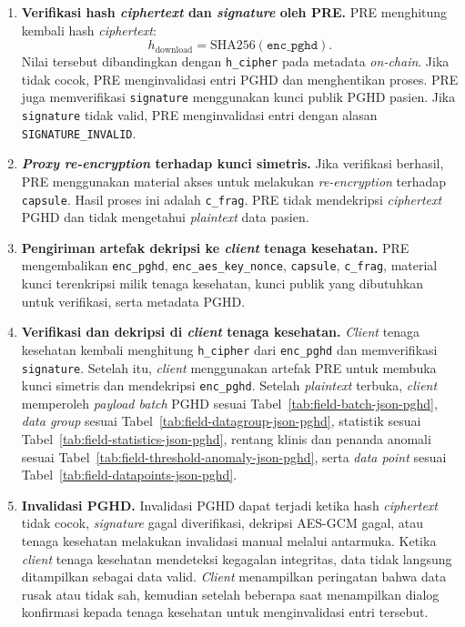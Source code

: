 \begin{enumerate}
	\item \textbf{Verifikasi hash \textit{ciphertext} dan \textit{signature} oleh PRE.}
	      PRE menghitung kembali hash \textit{ciphertext}:
	      \[
		      h_{\text{download}} = \mathrm{SHA256}(\texttt{enc\_pghd}).
	      \]
	      Nilai tersebut dibandingkan dengan \texttt{h\_cipher} pada metadata \textit{on-chain}.
	      Jika tidak cocok, PRE menginvalidasi entri PGHD dan menghentikan proses.
	      PRE juga memverifikasi \texttt{signature} menggunakan kunci publik PGHD pasien.
	      Jika \texttt{signature} tidak valid, PRE menginvalidasi entri dengan alasan \texttt{SIGNATURE\_INVALID}.

	\item \textbf{\textit{Proxy re-encryption} terhadap kunci simetris.}
	      Jika verifikasi berhasil, PRE menggunakan material akses untuk melakukan \textit{re-encryption} terhadap \texttt{capsule}.
	      Hasil proses ini adalah \texttt{c\_frag}.
	      PRE tidak mendekripsi \textit{ciphertext} PGHD dan tidak mengetahui \textit{plaintext} data pasien.

	\item \textbf{Pengiriman artefak dekripsi ke \textit{client} tenaga kesehatan.}
	      PRE mengembalikan \texttt{enc\_pghd}, \texttt{enc\_aes\_key\_nonce}, \texttt{capsule}, \texttt{c\_frag}, material kunci terenkripsi milik tenaga kesehatan, kunci publik yang dibutuhkan untuk verifikasi, serta metadata PGHD\@.

	\item \textbf{Verifikasi dan dekripsi di \textit{client} tenaga kesehatan.}
	      \textit{Client} tenaga kesehatan kembali menghitung \texttt{h\_cipher} dari \texttt{enc\_pghd} dan memverifikasi \texttt{signature}.
	      Setelah itu, \textit{client} menggunakan artefak PRE untuk membuka kunci simetris dan mendekripsi \texttt{enc\_pghd}.
	      Setelah \textit{plaintext} terbuka, \textit{client} memperoleh \textit{payload batch} PGHD sesuai Tabel~\ref{tab:field-batch-json-pghd}, \textit{data group} sesuai Tabel~\ref{tab:field-datagroup-json-pghd}, statistik sesuai Tabel~\ref{tab:field-statistics-json-pghd}, rentang klinis dan penanda anomali sesuai Tabel~\ref{tab:field-threshold-anomaly-json-pghd}, serta \textit{data point} sesuai Tabel~\ref{tab:field-datapoints-json-pghd}.

	\item \textbf{Invalidasi PGHD.}
	      Invalidasi PGHD dapat terjadi ketika hash \textit{ciphertext} tidak cocok, \textit{signature} gagal diverifikasi, dekripsi AES-GCM gagal, atau tenaga kesehatan melakukan invalidasi manual melalui antarmuka.
	      Ketika \textit{client} tenaga kesehatan mendeteksi kegagalan integritas, data tidak langsung ditampilkan sebagai data valid.
	      \textit{Client} menampilkan peringatan bahwa data rusak atau tidak sah, kemudian setelah beberapa saat menampilkan dialog konfirmasi kepada tenaga kesehatan untuk menginvalidasi entri tersebut.


\end{enumerate}
